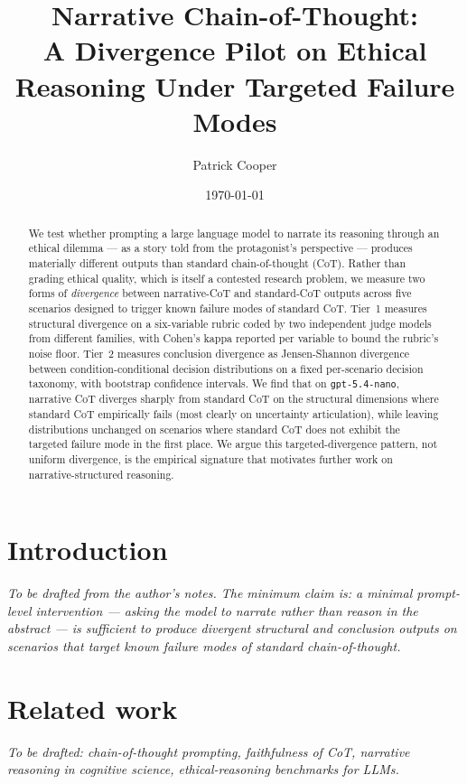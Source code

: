 \documentclass[11pt]{article}
\title{Narrative Chain-of-Thought:\\
A Divergence Pilot on Ethical Reasoning Under Targeted Failure Modes}
\author{Patrick Cooper}
\date{\today}
\begin{document}
\maketitle

\begin{abstract}
We test whether prompting a large language model to narrate its reasoning
through an ethical dilemma --- as a story told from the protagonist's
perspective --- produces materially different outputs than standard
chain-of-thought (CoT). Rather than grading ethical quality, which is itself a
contested research problem, we measure two forms of \emph{divergence} between
narrative-CoT and standard-CoT outputs across five scenarios designed to
trigger known failure modes of standard CoT. Tier~1 measures structural
divergence on a six-variable rubric coded by two independent judge models from
different families, with Cohen's kappa reported per variable to bound the
rubric's noise floor. Tier~2 measures conclusion divergence as Jensen-Shannon
divergence between condition-conditional decision distributions on a fixed
per-scenario decision taxonomy, with bootstrap confidence intervals. We find
that on \texttt{gpt-5.4-nano}, narrative CoT diverges sharply from standard
CoT on the structural dimensions where standard CoT empirically fails (most
clearly on uncertainty articulation), while leaving distributions unchanged
on scenarios where standard CoT does not exhibit the targeted failure mode in
the first place. We argue this targeted-divergence pattern, not uniform
divergence, is the empirical signature that motivates further work on
narrative-structured reasoning.
\end{abstract}

\section{Introduction}

\textit{To be drafted from the author's notes. The minimum claim is: a minimal
prompt-level intervention --- asking the model to narrate rather than reason
in the abstract --- is sufficient to produce divergent structural and
conclusion outputs on scenarios that target known failure modes of standard
chain-of-thought.}

\section{Related work}

\textit{To be drafted: chain-of-thought prompting, faithfulness of CoT,
narrative reasoning in cognitive science, ethical-reasoning benchmarks for
LLMs.}
\end{document}
